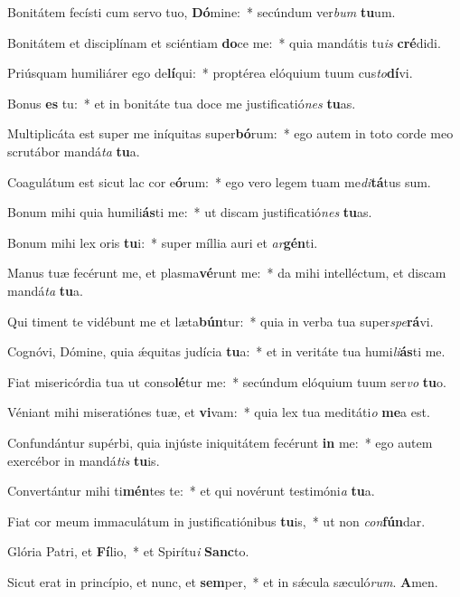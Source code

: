 \item Bonitátem fecísti cum servo tuo, \textbf{Dó}mine:~* secúndum ver\emph{bum} \textbf{tu}um.
\item Bonitátem et disciplínam et sciéntiam \textbf{do}ce me:~* quia mandátis tu\emph{is} \textbf{cré}didi.
\item Priúsquam humiliárer ego de\textbf{lí}qui:~* proptérea elóquium tuum cus\emph{to}\textbf{dí}vi.
\item Bonus \textbf{es} tu:~* et in bonitáte tua doce me justificatió\emph{nes} \textbf{tu}as.
\item Multiplicáta est super me iníquitas super\textbf{bó}rum:~* ego autem in toto corde meo scrutábor mandá\emph{ta} \textbf{tu}a.
\item Coagulátum est sicut lac cor e\textbf{ó}rum:~* ego vero legem tuam me\emph{di}\textbf{tá}tus sum.
\item Bonum mihi quia humili\textbf{ás}ti me:~* ut discam justificatió\emph{nes} \textbf{tu}as.
\item Bonum mihi lex oris \textbf{tu}i:~* super míllia auri et \emph{ar}\textbf{gén}ti.
\item Manus tuæ fecérunt me, et plasma\textbf{vé}runt me:~* da mihi intelléctum, et discam mandá\emph{ta} \textbf{tu}a.
\item Qui timent te vidébunt me et læta\textbf{bún}tur:~* quia in verba tua super\emph{spe}\textbf{rá}vi.
\item Cognóvi, Dómine, quia ǽquitas judícia \textbf{tu}a:~* et in veritáte tua humi\emph{li}\textbf{ás}ti me.
\item Fiat misericórdia tua ut conso\textbf{lé}tur me:~* secúndum elóquium tuum ser\emph{vo} \textbf{tu}o.
\item Véniant mihi miseratiónes tuæ, et \textbf{vi}vam:~* quia lex tua meditáti\emph{o} \textbf{me}a est.
\item Confundántur supérbi, quia injúste iniquitátem fecérunt \textbf{in} me:~* ego autem exercébor in mandá\emph{tis} \textbf{tu}is.
\item Convertántur mihi ti\textbf{mén}tes te:~* et qui novérunt testimóni\emph{a} \textbf{tu}a.
\item Fiat cor meum immaculátum in justificatiónibus \textbf{tu}is,~* ut non \emph{con}\textbf{fún}dar.
\item Glória Patri, et \textbf{Fí}lio,~* et Spirítu\emph{i} \textbf{Sanc}to.
\item Sicut erat in princípio, et nunc, et \textbf{sem}per,~* et in sǽcula sæculó\emph{rum}. \textbf{A}men.